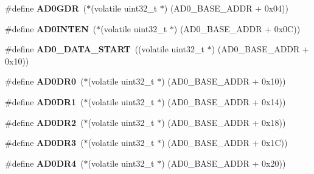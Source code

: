 \begin{DoxyCompactItemize}
\item 
\mbox{\label{group__lpc24xx__regs_ga614757380a519dbcbf297343f4868663}} 
\#define {\bfseries A\+D0\+G\+DR}~($\ast$(volatile uint32\+\_\+t $\ast$) (A\+D0\+\_\+\+B\+A\+S\+E\+\_\+\+A\+D\+DR + 0x04))
\item 
\mbox{\label{group__lpc24xx__regs_gaa0368cdd37b3e1eab9b03bcb1c4d632c}} 
\#define {\bfseries A\+D0\+I\+N\+T\+EN}~($\ast$(volatile uint32\+\_\+t $\ast$) (A\+D0\+\_\+\+B\+A\+S\+E\+\_\+\+A\+D\+DR + 0x0\+C))
\item 
\mbox{\label{group__lpc24xx__regs_gad2bd1b510762a448fca5f5ac2fd6ac60}} 
\#define {\bfseries A\+D0\+\_\+\+D\+A\+T\+A\+\_\+\+S\+T\+A\+RT}~((volatile uint32\+\_\+t $\ast$) (A\+D0\+\_\+\+B\+A\+S\+E\+\_\+\+A\+D\+DR + 0x10))
\item 
\mbox{\label{group__lpc24xx__regs_gab6342538ad695dc28352682dbb7bdd98}} 
\#define {\bfseries A\+D0\+D\+R0}~($\ast$(volatile uint32\+\_\+t $\ast$) (A\+D0\+\_\+\+B\+A\+S\+E\+\_\+\+A\+D\+DR + 0x10))
\item 
\mbox{\label{group__lpc24xx__regs_ga45a02f068ff994318718348fe595e38a}} 
\#define {\bfseries A\+D0\+D\+R1}~($\ast$(volatile uint32\+\_\+t $\ast$) (A\+D0\+\_\+\+B\+A\+S\+E\+\_\+\+A\+D\+DR + 0x14))
\item 
\mbox{\label{group__lpc24xx__regs_ga81287109d3e46b7948070914506ae1ff}} 
\#define {\bfseries A\+D0\+D\+R2}~($\ast$(volatile uint32\+\_\+t $\ast$) (A\+D0\+\_\+\+B\+A\+S\+E\+\_\+\+A\+D\+DR + 0x18))
\item 
\mbox{\label{group__lpc24xx__regs_gab3b6b3411fad87830caec8689ae890ba}} 
\#define {\bfseries A\+D0\+D\+R3}~($\ast$(volatile uint32\+\_\+t $\ast$) (A\+D0\+\_\+\+B\+A\+S\+E\+\_\+\+A\+D\+DR + 0x1\+C))
\item 
\mbox{\label{group__lpc24xx__regs_ga2c3d9599d0d11579c7d4b02463757e61}} 
\#define {\bfseries A\+D0\+D\+R4}~($\ast$(volatile uint32\+\_\+t $\ast$) (A\+D0\+\_\+\+B\+A\+S\+E\+\_\+\+A\+D\+DR + 0x20))
\item 
\mbox{\label{group__lpc24xx__regs_gac3ba1edf68765fb536e00f303e12a9a5}} 

\end{DoxyCompactItemize}
